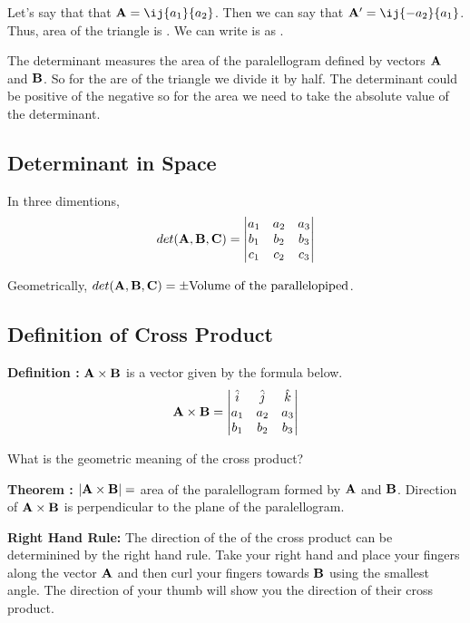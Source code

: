 Let's say that that ${\bf A} = \ij{a_1}{a_2}$. Then we can say that ${\bf A'} = \ij{-a_2}{a_1}$.
Thus, area of the triangle is .
We can write is as
.

The determinant measures the area of the paralellogram defined by vectors ${\bf A}$ and ${\bf B}$.
So for the are of the triangle we divide it by half.
The determinant could be positive of the negative so for the area we need to take the absolute value of the determinant.

\subsection{Determinant in Space}

In three dimentions,
$$
det({\bf A}, {\bf B}, {\bf C}) =
\begin{vmatrix*}
	a_1 & a_2 & a_3 \\
	b_1 & b_2 & b_3 \\
	c_1 & c_2 & c_3
\end{vmatrix*}
$$

Geometrically, $det({\bf A}, {\bf B}, {\bf C}) = \pm \text{Volume of the parallelopiped}$.

\subsection{Definition of Cross Product}

{\bf Definition : } ${\bf A} \times {\bf B}$ is a vector given by the formula below.
$$
{\bf A} \times {\bf B} =
\begin{vmatrix*}
	\hat{i} & \hat{j} & \hat{k} \\
	a_1 & a_2 & a_3 \\
	b_1 & b_2 & b_3
\end{vmatrix*}
$$

What is the geometric meaning of the cross product?


{\bf Theorem : } $|{\bf A} \times {\bf B}| = $ area of the paralellogram formed by ${\bf A}$ and ${\bf B}$.
Direction of ${\bf A} \times {\bf B}$ is perpendicular to the plane of the paralellogram.


{\bf Right Hand Rule: } The direction of the of the cross product can be determinined by the right hand rule.
Take your right hand and place your fingers along the vector ${\bf A}$ and then curl your fingers towards ${\bf B}$ using the smallest angle.
The direction of your thumb will show you the direction of their cross product.

